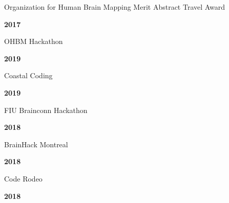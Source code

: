 \documentclass[10pt]{article}
\newcommand{\sectionstyle}{\LARGE \fontfamily{lmr}\selectfont}
\begin{document}
\begin{minipage}[t]{.85\linewidth}
\flushleft
\noindent
Organization for Human Brain Mapping Merit Abstract Travel Award
\end{minipage}
\hfill
\begin{minipage}[t]{.15\linewidth}
\flushright
\noindent
\textsc{\textbf{2017}}
\end{minipage}

\bigskip

\begin{center}\sectionstyle{HACKATHONS}\end{center}

\begin{minipage}[t]{.85\linewidth}
\flushleft
\noindent
OHBM Hackathon
\end{minipage}
\hfill
\begin{minipage}[t]{.15\linewidth}
\flushright
\noindent
\textsc{\textbf{2019}}
\end{minipage}

\begin{minipage}[t]{.85\linewidth}
\flushleft
\noindent
Coastal Coding
\end{minipage}
\hfill
\begin{minipage}[t]{.15\linewidth}
\flushright
\noindent
\textsc{\textbf{2019}}
\end{minipage}

\begin{minipage}[t]{.85\linewidth}
\flushleft
\noindent
FIU Brainconn Hackathon
\end{minipage}
\hfill
\begin{minipage}[t]{.15\linewidth}
\flushright
\noindent
\textsc{\textbf{2018}}
\end{minipage}

\begin{minipage}[t]{.85\linewidth}
\flushleft
\noindent
BrainHack Montreal
\end{minipage}
\hfill
\begin{minipage}[t]{.15\linewidth}
\flushright
\noindent
\textsc{\textbf{2018}}
\end{minipage}

\begin{minipage}[t]{.85\linewidth}
\flushleft
\noindent
Code Rodeo
\end{minipage}
\hfill
\begin{minipage}[t]{.15\linewidth}
\flushright
\noindent
\textsc{\textbf{2018}}
\end{minipage}
\end{document}
